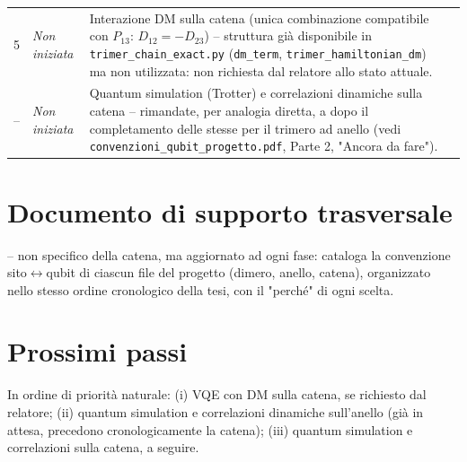 \documentclass[11pt,a4paper]{article}
\begin{document}
\begin{longtable}{@{}p{1.6cm}p{2.0cm}p{7.3cm}p{2.2cm}@{}}
5 & \textit{Non iniziata} &
Interazione DM sulla catena (unica combinazione compatibile con $P_{13}$:
$D_{12}=-D_{23}$) -- struttura già disponibile in
\texttt{trimer\_chain\_exact.py} (\texttt{dm\_term}, \texttt{trimer\_hamiltonian\_dm})
ma non utilizzata: non richiesta dal relatore allo stato attuale.
&\\[10pt]

-- & \textit{Non iniziata} &
Quantum simulation (Trotter) e correlazioni dinamiche sulla catena --
rimandate, per analogia diretta, a dopo il completamento delle stesse per
il trimero ad anello (vedi \texttt{convenzioni\_qubit\_progetto.pdf},
Parte 2, "Ancora da fare").
&\\

\bottomrule
\end{longtable}

\section{Documento di supporto trasversale}

\texttt{} -- non specifico della catena,
ma aggiornato ad ogni fase: cataloga la convenzione sito$\leftrightarrow$qubit
di ciascun file del progetto (dimero, anello, catena), organizzato nello
stesso ordine cronologico della tesi, con il "perché" di ogni scelta.

\section{Prossimi passi}

In ordine di priorità naturale: (i) VQE con DM sulla catena, se richiesto
dal relatore; (ii) quantum simulation e correlazioni dinamiche
sull'anello (già in attesa, precedono cronologicamente la catena); (iii)
quantum simulation e correlazioni sulla catena, a seguire.
\end{document}
